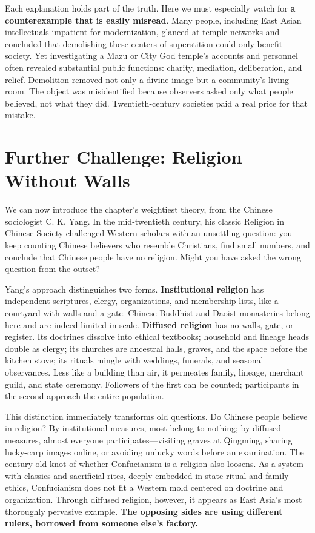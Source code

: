 Each explanation holds part of the truth. Here we must especially watch for \textbf{a counterexample that is easily misread}. Many people, including East Asian intellectuals impatient for modernization, glanced at temple networks and concluded that demolishing these centers of superstition could only benefit society. Yet investigating a Mazu or City God temple's accounts and personnel often revealed substantial public functions: charity, mediation, deliberation, and relief. Demolition removed not only a divine image but a community's living room. The object was misidentified because observers asked only what people believed, not what they did. Twentieth-century societies paid a real price for that mistake.

\section{Further Challenge: Religion Without Walls}
We can now introduce the chapter's weightiest theory, from the Chinese sociologist C. K. Yang. In the mid-twentieth century, his classic Religion in Chinese Society challenged Western scholars with an unsettling question: you keep counting Chinese believers who resemble Christians, find small numbers, and conclude that Chinese people have no religion. Might you have asked the wrong question from the outset?

Yang's approach distinguishes two forms. \textbf{Institutional religion} has independent scriptures, clergy, organizations, and membership lists, like a courtyard with walls and a gate. Chinese Buddhist and Daoist monasteries belong here and are indeed limited in scale. \textbf{Diffused religion} has no walls, gate, or register. Its doctrines dissolve into ethical textbooks; household and lineage heads double as clergy; its churches are ancestral halls, graves, and the space before the kitchen stove; its rituals mingle with weddings, funerals, and seasonal observances. Less like a building than air, it permeates family, lineage, merchant guild, and state ceremony. Followers of the first can be counted; participants in the second approach the entire population.

This distinction immediately transforms old questions. Do Chinese people believe in religion? By institutional measures, most belong to nothing; by diffused measures, almost everyone participates---visiting graves at Qingming, sharing lucky-carp images online, or avoiding unlucky words before an examination. The century-old knot of whether Confucianism is a religion also loosens. As a system with classics and sacrificial rites, deeply embedded in state ritual and family ethics, Confucianism does not fit a Western mold centered on doctrine and organization. Through diffused religion, however, it appears as East Asia's most thoroughly pervasive example. \textbf{The opposing sides are using different rulers, borrowed from someone else's factory.}

